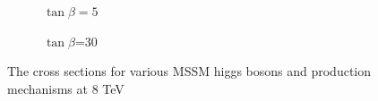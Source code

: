 \begin{figure}[hb]
\centering
  \begin{subfigure}[b]{.4\textwidth}
	\label{fig:tanbeta5}
	\caption[]{$\tan\beta=5$}
	\end{subfigure}	
   \begin{subfigure}[b]{.4\textwidth}
	\caption[]{$\tan\beta$=30}
	\label{fig:tanbeta30}
    \end{subfigure}	

  \caption[]
   	{The cross sections for various MSSM higgs bosons and production 
	mechanisms at 8 TeV \cite{LHCHiggsCrossSectionWorkingGroup:2011ti}}
    \label{fig:tanbeta}
\end{figure}





